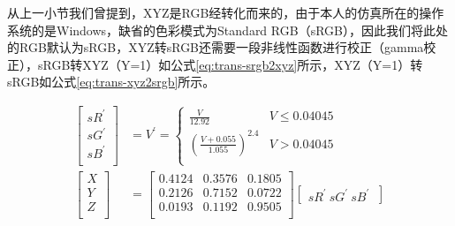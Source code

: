 从上一小节我们曾提到，XYZ是RGB经转化而来的，由于本人的仿真所在的操作系统的是Windows，缺省的色彩模式为Standard RGB（sRGB），因此我们将此处的RGB默认为sRGB，XYZ转sRGB还需要一段非线性函数进行校正（gamma校正），sRGB转XYZ（Y=1）如公式\eqref{eq:trans-srgb2xyz}所示，XYZ（Y=1）转sRGB如公式\eqref{eq:trans-xyz2srgb}所示。

\begin{equation}
    \begin{aligned}
        \begin{bmatrix}
            sR^\prime\\
            sG^\prime\\
            sB^\prime\\
        \end{bmatrix} & = V^\prime = \left\{ \begin{matrix}
            \frac{V}{12.92} & V\leq 0.04045 \\
            (\frac{V+0.055}{1.055})^{2.4} & V> 0.04045 \\
        \end{matrix} \right.
        \\
        \begin{bmatrix}
            X\\
            Y\\
            Z\\
        \end{bmatrix} &= 
        \begin{bmatrix}
            0.4124 & 0.3576 & 0.1805\\
            0.2126 & 0.7152 & 0.0722\\
            0.0193 & 0.1192 & 0.9505\\
        \end{bmatrix}\begin{bmatrix}
            sR^\prime\
            sG^\prime\
            sB^\prime\
        \end{bmatrix} 
    \end{aligned}
    \label{eq:trans-srgb2xyz}
\end{equation}


